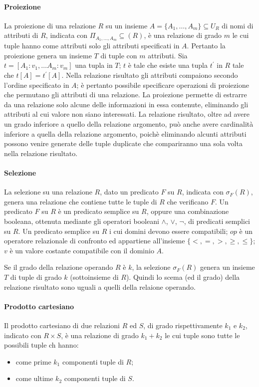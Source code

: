 \paragraph{Proiezione}%
\label{par:Proiezione}
La proiezione di una relazione $R$ su un insieme $A=\{A_1,\dots,A_m\}\subseteq
U_R$ di nomi di attributi di $R$, indicata con $\Pi_{A_1,\dots,A_m}\subseteq
(R)$, è una relazione di grado $m$ le cui tuple hanno come attributi solo gli
attributi specificati in $A$.
Pertanto la proiezione genera un insieme $T$ di tuple con $m$ attributi.
Sia $t=[A_1:v_1,\dots A_m:v_m]$ una tupla in $T$; $t$ è tale che esiste una
tupla $t^\prime$ in $R$ tale che $t[A]=t^\prime[A]$.
Nella relazione risultato gli attributi compaiono secondo l'ordine specificato
in $A$; è pertanto possibile specificare operazioni di proiezione che permutano
gli attributi di una relazione.
La proiezione permette di estrarre da una relazione solo alcune delle
informazioni in essa contenute, eliminando gli attributi al cui valore non siano
interessati.
La relazione risultato, oltre ad avere un grado inferiore a quello della
relazione argomento, può anche avere cardinalità inferiore a quella della
relazione argomento, poichè eliminando alcunti attributi possono venire generate
delle tuple duplicate che compariranno una sola volta nella relazione risultato.

\paragraph{Selezione}%
\label{par:Selezione}
La selezione su una relazione $R$, dato un predicato $F$ su $R$, indicata con
$\sigma_F(R)$, genera una relazione che contiene tutte le tuple di $R$ che
verificano $F$.
Un predicato $F$ su $R$ è un predicato semplice su $R$, oppure una combinazione
booleana, ottenuta mediante gli operatori booleani $\wedge$, $\vee$, $\neg$, di
predicati semplici su $R$.
Un predicato semplice su $R$ i cui domini devono essere compatibili; $op$ è un
operatore relazionale di confronto ed appartiene all'insieme
$\{<,=,>,\geq,\leq\}$; $v$ è un valore costante compatibile con il dominio
$A$.

Se il grado della relazione operando $R$ è $k$, la selezione $\sigma_F(R)$
genera un insieme $T$ di tuple di grado $k$ (sottoinsieme di $R$). Quindi lo
scema (ed il grado) della relazione risultato sono uguali a quelli della
relaione operando.

\paragraph{Prodotto cartesiano}%
\label{par:Prodotto cartesiano}
Il prodotto cartesiano di due relazioni $R$ ed $S$, di grado rispettivamente
$k_1$ e $k_2$, indicato con $R\times S$, è una relazione di grado $k_1+k_2$ le
cui tuple sono tutte le possibili tuple ch hanno:
\begin{itemize}
  \item come prime $k_1$ componenti tuple di $R$;
  \item come ultime $k_2$ componenti tuple di $S$.
\end{itemize}

